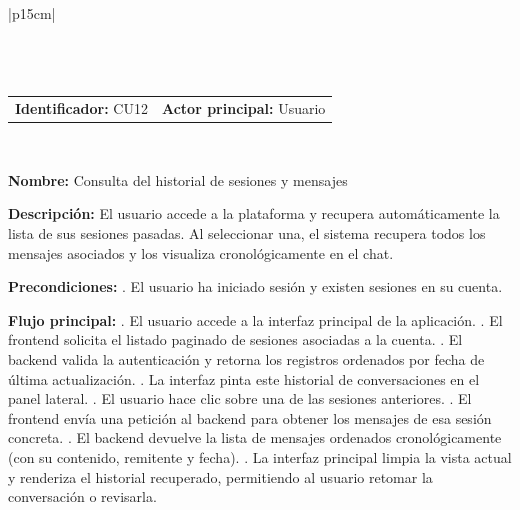 \begingroup
{}
\setlength{\arrayrulewidth}{1pt}
\begin{longtable}{|p{15cm}|}
  \hline
   \\
  \hline
  \endfirsthead
   \\
  \hline
   \\
  \hline
  \endhead
  \hline {} \\ \hline
  \endfoot
  \hline
  \caption{Caso de Uso CU12 — Consulta del historial de sesiones y mensajes.}
  \label{TB:CU12_HISTORIAL}
  \endlastfoot

  \begin{tabularx}{\linewidth}{@{}X X@{}}
    \textbf{Identificador:} CU12 & \textbf{Actor principal:} Usuario
  \end{tabularx} \\ \hline

  \textbf{Nombre:} Consulta del historial de sesiones y mensajes \\ \hline

  \textbf{Descripción:} \newline 
  El usuario accede a la plataforma y recupera automáticamente la lista de sus sesiones pasadas. Al seleccionar una, el sistema recupera todos los mensajes asociados y los visualiza cronológicamente en el chat. \\ \hline

  \textbf{Precondiciones:} . El usuario ha iniciado sesión y existen sesiones en su cuenta. \\ \hline

  \textbf{Flujo principal:} . El usuario accede a la interfaz principal de la aplicación. . El frontend solicita el listado paginado de sesiones asociadas a la cuenta. . El backend valida la autenticación y retorna los registros ordenados por fecha de última actualización. . La interfaz pinta este historial de conversaciones en el panel lateral. . El usuario hace clic sobre una de las sesiones anteriores. . El frontend envía una petición al backend para obtener los mensajes de esa sesión concreta. . El backend devuelve la lista de mensajes ordenados cronológicamente (con su contenido, remitente y fecha). . La interfaz principal limpia la vista actual y renderiza el historial recuperado, permitiendo al usuario retomar la conversación o revisarla. \\ \hline


\end{longtable}
